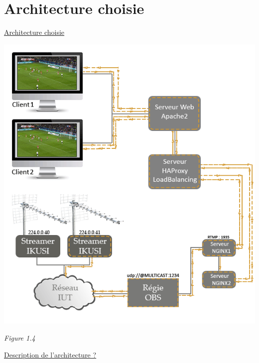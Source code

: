 \documentclass{report}
\begin{document}
    \section{Architecture choisie}  
    
    \underline{Architecture choisie}\\
    
    \begin{center}
    \includegraphics[width=13.5cm]{img/schema.png}
    
    \textit{\small{Figure 1.4}}
    \end{center}    
    \underline{Description de l’architecture ?}\\
    
\end{document}
